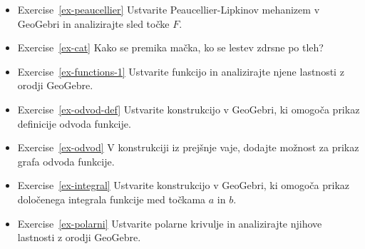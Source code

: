 \begin{itemize}
\item Exercise~\ref{ex-peaucellier} Ustvarite Peaucellier-Lipkinov mehanizem v GeoGebri in analizirajte sled točke $F$.
\item Exercise~\ref{ex-cat} Kako se premika mačka, ko se lestev zdrsne po tleh?
\item Exercise~\ref{ex-functions-1} Ustvarite funkcijo in analizirajte njene lastnosti z orodji GeoGebre.
\item Exercise~\ref{ex-odvod-def} Ustvarite konstrukcijo v GeoGebri, ki omogoča prikaz definicije odvoda funkcije.
\item Exercise~\ref{ex-odvod} V konstrukciji iz prejšnje vaje, dodajte možnost za prikaz grafa odvoda funkcije.
\item Exercise~\ref{ex-integral} Ustvarite konstrukcijo v GeoGebri, ki omogoča prikaz določenega integrala funkcije med točkama $a$ in $b$.
\item Exercise~\ref{ex-polarni} Ustvarite polarne krivulje in analizirajte njihove lastnosti z orodji GeoGebre.
\end{itemize}